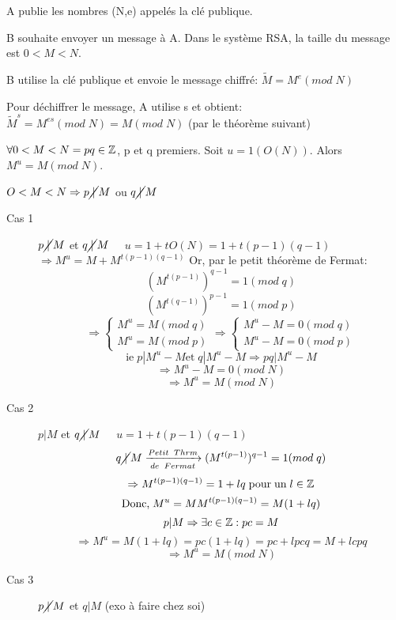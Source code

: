 A publie les nombres (N,e) appelés la clé publique.

B souhaite envoyer un message à A. Dans le système RSA, la taille du message est $0<M<N$.

B utilise la clé publique et envoie le message chiffré: $\tilde{M} = M^e (mod\;N)$

Pour déchiffrer le message, A utilise s et obtient: $\tilde{M}^s = M^{es}(mod\;N) = M(mod\;N)$ (par le théorème suivant)

\begin{thrm}
$\forall 0 < M < N = pq \in \mathbb{Z}$, p et q premiers. Soit $u = 1 (O(N))$. Alors $M^u = M(mod \; N)$.
\end{thrm}

\begin{demo}
$O < M < N \Rightarrow p \cancel{\;|\;} M$ ou $q \cancel{\;|\;} M$

\begin{description}
	\item[Cas 1] $p \cancel{\;|\;} M$ et $q \cancel{\;|\;} M$
		$\quad u = 1 + t O(N) = 1 + t(p-1)(q-1)$
		$\Rightarrow M^u = M + M^{t(p-1)(q-1)}$
		Or, par le petit théorème de Fermat: 
			\[ (M^{t(p-1)})^{q-1} = 1 (mod\; q)\]
			\[ (M^{t(q-1)})^{p-1} = 1 (mod\; p)\]
			\[ \Rightarrow \left\{\begin{matrix}
				M^u = M (mod\; q) \\ 
				M^u = M (mod\; p)
				\end{matrix}\right. \Rightarrow \left\{\begin{matrix}
				M^u - M= 0(mod\;q)\\ 
				M^u - M= 0(mod\;p)
				\end{matrix}\right. \]
			\[ \text{ie}\; p|M^u - M \text{et}\; q|M^u - M \Rightarrow pq| M^u - M \]
			\[ \Rightarrow M^u - M = 0(mod\; N) \]
			\[ \Rightarrow M^u = M(mod \; N) \]
	\item[Cas 2] $ p | M$ et $ q \cancel{\;|\;} M$
			$\quad u = 1 + t(p-1)(q-1)$
			\[ q \cancel{\;|\;} M \xrightarrow[de\;\; Fermat]{Petit \;\;Thrm} (M^{t(p-1)})^{q-1} = 1(mod \; q) \]
			\[ \Rightarrow M^{t(p-1)(q-1)} = 1 + lq \text{\;pour\;un\;} l \in \mathbb{Z} \]
			\[ \text{Donc,\;} M^u = M M^{t(p-1)(q-1)} = M(1+lq) \]
			\[ p|M \Rightarrow \exists c \in \mathbb{Z}: pc = M \]
			\[ \Rightarrow M^u  = M(1+lq) = pc(1+lq) = pc + lpcq = M + lcpq \]
			\[ \Rightarrow M^u = M(mod \; N) \]
	\item[Cas 3] $p \cancel{\;|\;} M$ et $q | M$ (exo à faire chez soi)
\end{description}
\end{demo}